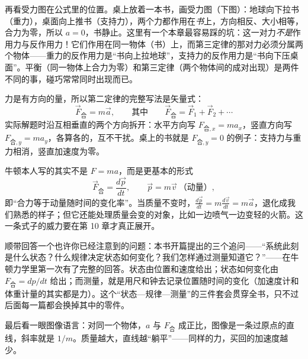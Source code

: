 \begin{mainline}
再看受力图在公式里的位置。桌上放着一本书，画受力图（下图）：地球向下拉书（重力），桌面向上推书（支持力），两个力都作用在\emph{书}上，方向相反、大小相等，合力为零，所以 \(a=0\)，书静止。这里有一个本章最容易踩的坑：这一对力\emph{不是}作用力与反作用力！它们作用在同一物体（书）上，而第三定律的那对力必须分属两个物体——重力的反作用力是“书向上拉地球”，支持力的反作用力是“书向下压桌面”。平衡（同一物体上合力为零）和第三定律（两个物体间的成对出现）是两件不同的事，碰巧常常同时出现而已。
\end{mainline}

\begin{center}
\end{center}

\begin{mathbridge}
力是有方向的量，所以第二定律的完整写法是矢量式：
\[
  \vec{F}_{\text{合}} = m\vec{a},
  \qquad\text{其中}\qquad
  \vec{F}_{\text{合}} = \vec{F}_1 + \vec{F}_2 + \cdots
\]
实际解题时沿互相垂直的两个方向拆开：水平方向写 \(F_{\text{合},x}=ma_x\)，竖直方向写 \(F_{\text{合},y}=ma_y\)，各算各的，互不干扰。桌上的书就是 \(F_{\text{合},y}=0\) 的例子：支持力与重力相消，竖直加速度为零。

牛顿本人写的其实不是 \(F=ma\)，而是更基本的形式
\[
  \vec{F}_{\text{合}} = \frac{d\vec{p}}{dt},
  \qquad \vec{p}=m\vec{v}\ \text{（动量）},
\]
即“合力等于动量随时间的变化率”。当质量不变时，\(\frac{d\vec{p}}{dt}=m\frac{d\vec{v}}{dt}=m\vec{a}\)，退化成我们熟悉的样子；但它还能处理质量会变的对象，比如一边喷气一边变轻的火箭。这一条式子的威力要在第 10 章才真正展开。

顺带回答一个也许你已经注意到的问题：本书开篇提出的三个追问——“系统此刻是什么状态？什么规律决定状态如何变化？我们怎样通过测量知道它？”——在牛顿力学里第一次有了完整的回答。状态由位置和速度给出；状态如何变化由 \(F_{\text{合}}=dp/dt\) 给出；而测量，就是用尺和钟去记录位置随时间的变化（加速度计和体重计量的其实都是力）。这个“状态—规律—测量”的三件套会贯穿全书，只不过后面每一篇都会换掉其中的零件。

最后看一眼图像语言：对同一个物体，\(a\) 与 \(F_{\text{合}}\) 成正比，图像是一条过原点的直线，斜率就是 \(1/m\)。质量越大，直线越“躺平”——同样的力，买回的加速度越少。
\end{mathbridge}

